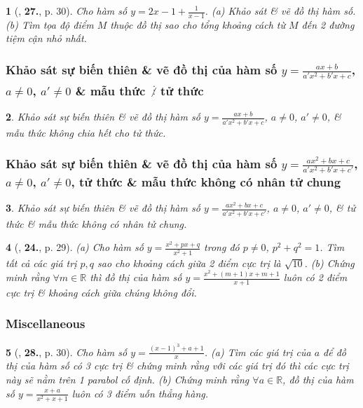 \documentclass{article}
\newtheorem{baitoan}{}
\begin{document}
\begin{baitoan}[\cite{TLCT_giai_tich_12}, \textbf{27.}, p. 30]
	Cho hàm số $y = 2x - 1 + \frac{1}{x - 1}$. (a) Khảo sát \& vẽ đồ thị hàm số. (b) Tìm tọa độ điểm $M$ thuộc đồ thị sao cho tổng khoảng cách từ $M$ đến 2 đường tiệm cận nhỏ nhất.	
\end{baitoan}

\subsubsection{Khảo sát sự biến thiên \& vẽ đồ thị của hàm số $y = \frac{ax + b}{a'x^2 + b'x + c}$, $a\ne 0$, $a'\ne 0$ \& mẫu thức $\not\vdots$ tử thức}

\begin{baitoan}
	Khảo sát sự biến thiên \& vẽ đồ thị hàm số $y = \frac{ax + b}{a'x^2 + b'x + c}$, $a\ne 0$, $a'\ne 0$, \& mẫu thức không chia hết cho tử thức.
\end{baitoan}

\subsubsection{Khảo sát sự biến thiên \& vẽ đồ thị của hàm số $y = \frac{ax^2 + bx + c}{a'x^2 + b'x + c'}$, $a\ne 0$, $a'\ne 0$, tử thức \& mẫu thức không có nhân tử chung}

\begin{baitoan}
	Khảo sát sự biến thiên \& vẽ đồ thị hàm số $y = \frac{ax^2 + bx + c}{a'x^2 + b'x + c'}$, $a\ne 0$, $a'\ne 0$, \& tử thức \& mẫu thức không có nhân tử chung.
\end{baitoan}

\begin{baitoan}[\cite{TLCT_giai_tich_12}, \textbf{24.}, p. 29]
	(a) Cho hàm số $y = \frac{x^2 + px + q}{x^2 + 1}$ trong đó $p\ne 0$, $p^2 + q^2 = 1$. Tìm tất cả các giá trị $p,q$ sao cho khoảng cách giữa 2 điểm cực trị là $\sqrt{10}$. (b) Chứng minh rằng $\forall m\in\mathbb{R}$ thì đồ thị của hàm số $y = \frac{x^2 + (m + 1)x + m + 1}{x + 1}$ luôn có 2 điểm cực trị \& khoảng cách giữa chúng không đổi.	
\end{baitoan}

\subsubsection{Miscellaneous}

\begin{baitoan}[\cite{TLCT_giai_tich_12}, \textbf{28.}, p. 30]
	Cho hàm số $y = \frac{(x - 1)^3 + a + 1}{x}$. (a) Tìm các giá trị của $a$ để đồ thị của hàm số có 3 cực trị \& chứng minh rằng với các giá trị đó thì các cực trị này sẽ nằm trên 1 parabol cố định. (b) Chứng minh rằng $\forall a\in\mathbb{R}$, đồ thị của hàm số $y = \frac{x + a}{x^2 + x + 1}$ luôn có 3 điểm uốn thẳng hàng.	
\end{baitoan}
\end{document}
